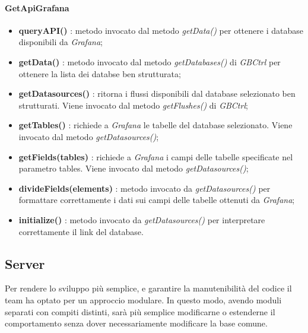 				  \paragraph{GetApiGrafana}
			\begin{itemize}
				\item \textbf{queryAPI()} : metodo invocato dal metodo \textit{getData()} per ottenere i database disponibili da \textit{Grafana};
				\item \textbf{getData()} : metodo invocato dal metodo \textit{getDatabases()} di \textit{GBCtrl} per ottenere la lista dei databse ben strutturata;
				\item \textbf{getDatasources()} : ritorna i flussi disponibili dal database selezionato ben strutturati. Viene invocato dal metodo \textit{getFlushes()} di \textit{GBCtrl};
				\item \textbf{getTables()} : richiede a \textit{Grafana} le tabelle del database selezionato. Viene invocato dal metodo \textit{getDatasources()};
				\item \textbf{getFields(tables)} : richiede a \textit{Grafana} i campi delle tabelle specificate nel parametro tables. Viene invocato dal metodo \textit{getDatasources()};
				\item \textbf{divideFields(elements)} : metodo invocato da \textit{getDatasources()} per formattare correttamente i dati sui campi delle tabelle ottenuti da \textit{Grafana};
				\item \textbf{initialize()} : metodo invocato da \textit{getDatasources()} per interpretare correttamente il link del database.
			\end{itemize}



\newpage
\subsection{Server}\label{archServer}
Per rendere lo sviluppo più semplice, e garantire la manutenibilità del codice il team ha optato per un approccio modulare. In questo modo, avendo moduli separati con compiti distinti, sarà più semplice modificarne o estenderne il comportamento senza dover necessariamente modificare la base comune.\\

